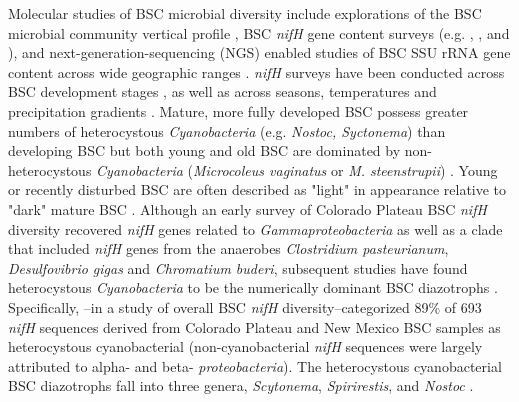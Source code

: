 Molecular studies of BSC microbial diversity include explorations of the BSC
microbial community vertical profile \citep{Garcia_Pichel_2003}, BSC
\textit{nifH} gene content surveys (e.g. \citet{14766579}, \citet{Yeager_2012},
\citet{Yeager} and \citet{Steppe_1996}), and next-generation-sequencing (NGS)
enabled studies of BSC SSU rRNA gene content across wide geographic ranges
\citep{Garcia_Pichel_2013, Steven_2013}. 
\textit{nifH} surveys have been conducted across BSC development stages
\citep{14766579}, as well as across seasons, temperatures and precipitation
gradients \citep{Yeager_2012}. Mature, more fully developed BSC possess greater
numbers of heterocystous \textit{Cyanobacteria} (e.g. \textit{Nostoc,
Syctonema}) than developing BSC but both young and old BSC are dominated by
non-heterocystous \textit{Cyanobacteria} (\textit{Microcoleus vaginatus} or
\textit{M. steenstrupii}) \citep{14766579, Garcia_Pichel_2013}. Young or
recently disturbed BSC are often described as "light" in appearance relative to
"dark" mature BSC \citep{Belnap_2002, 14766579}.  Although an early survey of
Colorado Plateau BSC \textit{nifH} diversity recovered \textit{nifH} genes
related to \textit{Gammaproteobacteria} as well as a clade that included
\textit{nifH} genes from the anaerobes \textit{Clostridium pasteurianum},
\textit{Desulfovibrio gigas} and \textit{Chromatium buderi}, subsequent studies
have found heterocystous \textit{Cyanobacteria} to be the numerically dominant
BSC diazotrophs \citep{Yeager, 14766579, Yeager_2012}. Specifically,
\citet{Yeager}--in a study of overall BSC \textit{nifH} diversity--categorized
89\% of 693 \textit{nifH} sequences derived from Colorado Plateau and New
Mexico BSC samples as heterocystous cyanobacterial (non-cyanobacterial
\textit{nifH} sequences were largely attributed to alpha- and beta-
\textit{proteobacteria}). The heterocystous cyanobacterial BSC diazotrophs fall
into three genera, \textit{Scytonema}, \textit{Spirirestis}, and
\textit{Nostoc} \citep{Yeager, Yeager_2012}. 

